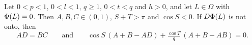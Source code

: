 \begin{lemma}\label{lem:rank}
Let $0<p<1$, $0<l<1$, $q\ge1$, $0<t<q$ and $h>0$, and let $L\in\Omega$ with
$\Phi(L)=0$. Then $A,B,C\in(0,1)$, $S+T>\pi$ and $\cos S<0$. If $D\Phi(L)$
is not onto, then
\begin{equation}\label{eq:minors}
  AD=BC\qquad\text{and}\qquad
  \cos S\,(A+B-AD)+\tfrac{\cos T}{q}\,(A+B-AB)=0 .
\end{equation}
\end{lemma}

